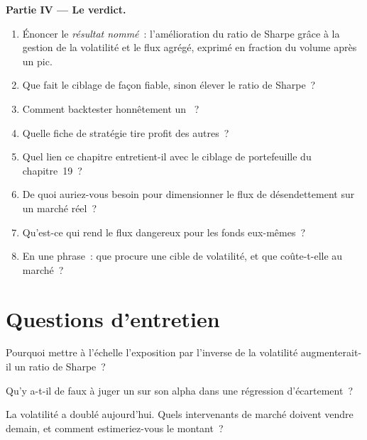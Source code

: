 \begin{problem}
\medskip\noindent\textbf{Partie IV --- Le verdict.}
\begin{enumerate}[resume]
\item Énoncer le \emph{résultat nommé}~: l'amélioration du ratio de Sharpe grâce à la gestion de la volatilité et le flux agrégé, exprimé en fraction du volume après un pic.
\item Que fait le ciblage de façon fiable, sinon élever le ratio de Sharpe~?
\item Comment backtester honnêtement un ~?
\item Quelle fiche de stratégie tire profit des autres~?
\item Quel lien ce chapitre entretient-il avec le ciblage de portefeuille du chapitre~19~?
\item De quoi auriez-vous besoin pour dimensionner le flux de désendettement sur un marché réel~?
\item Qu'est-ce qui rend le flux dangereux pour les fonds eux-mêmes~?
\item En une phrase~: que procure une cible de volatilité, et que coûte-t-elle au marché~?
\end{enumerate}
\end{problem}

\section{Questions d'entretien}

\begin{interviewq}\label{iq:s1:volatility-targeting-and-risk-managed-portfolios:1}
Pourquoi mettre à l'échelle l'exposition par l'inverse de la volatilité augmenterait-il un ratio de Sharpe~?
\end{interviewq}

\begin{interviewq}\label{iq:s1:volatility-targeting-and-risk-managed-portfolios:2}
Qu'y a-t-il de faux à juger un  sur son alpha dans une régression d'écartement~?
\end{interviewq}

\begin{interviewq}\label{iq:s1:volatility-targeting-and-risk-managed-portfolios:3}
La volatilité a doublé aujourd'hui. Quels intervenants de marché doivent vendre demain, et comment estimeriez-vous le montant~?
\end{interviewq}

